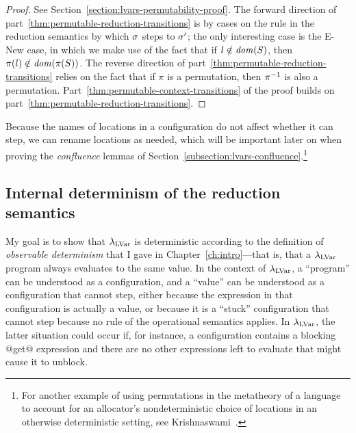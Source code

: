\LVarsLemPermutability
\begin{proof}
  See Section~\ref{section:lvars-permutability-proof}.  The forward
  direction of part~\ref{thm:permutable-reduction-transitions} is by
  cases on the rule in the reduction semantics by which $\sigma$ steps
  to $\sigma'$; the only interesting case is the {\sc E-New} case, in
  which we make use of the fact that if $l \notin \mathit{dom}(S)$, then
  $\pi(l) \notin \mathit{dom}(\pi(S))$. The reverse direction of
  part~\ref{thm:permutable-reduction-transitions} relies on the fact
  that if $\pi$ is a permutation, then $\pi^{-1}$ is also a permutation.
  Part~\ref{thm:permutable-context-transitions} of the proof builds on
  part~\ref{thm:permutable-reduction-transitions}.
\end{proof}

Because the names of locations in a configuration do not affect
whether it can step, we can rename locations as needed, which will be
important later on when proving the \emph{confluence} lemmas of
Section~\ref{subsection:lvars-confluence}.\footnote{For another
  example of using permutations in the metatheory of a language to
  account for an allocator's nondeterministic choice of locations in
  an otherwise deterministic setting, see
  Krishnaswami~\cite{simple-frp}.}

\subsection{Internal determinism of the reduction semantics}


My goal is to show that $\lambda_{\textrm{LVar}}$ is deterministic according to
the definition of \emph{observable determinism} that I gave in
Chapter~\ref{ch:intro}---that is, that a $\lambda_{\textrm{LVar}}$ program always
evaluates to the same value.  In the context of $\lambda_{\textrm{LVar}}$, a
``program'' can be understood as a configuration, and a ``value'' can
be understood as a configuration that cannot step, either because the
expression in that configuration is actually a value, or because it is
a ``stuck'' configuration that cannot step because no rule of the
operational semantics applies.  In $\lambda_{\textrm{LVar}}$, the latter situation
could occur if, for instance, a configuration contains a blocking
@get@ expression and there are no other expressions left to evaluate
that might cause it to unblock.

